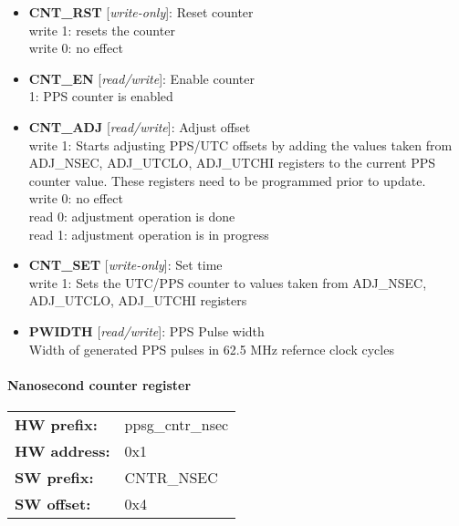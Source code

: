 \begin{itemize}
\item \begin{small}
{\bf 
CNT\_RST
} [\emph{write-only}]: Reset counter
\\
write 1: resets the counter\\                				write 0: no effect
\end{small}
\item \begin{small}
{\bf 
CNT\_EN
} [\emph{read/write}]: Enable counter
\\
1: PPS counter is enabled
\end{small}
\item \begin{small}
{\bf 
CNT\_ADJ
} [\emph{read/write}]: Adjust offset
\\
write 1: Starts adjusting PPS/UTC offsets by adding the values taken from ADJ\_NSEC, ADJ\_UTCLO, ADJ\_UTCHI registers to the current PPS counter value. These registers need to be programmed prior to update.\\				                write 0: no effect\\				 read 0: adjustment operation is done\\				 read 1: adjustment operation is in progress
\end{small}
\item \begin{small}
{\bf 
CNT\_SET
} [\emph{write-only}]: Set time
\\
write 1: Sets the UTC/PPS counter to values taken from ADJ\_NSEC, ADJ\_UTCLO, ADJ\_UTCHI registers
\end{small}
\item \begin{small}
{\bf 
PWIDTH
} [\emph{read/write}]: PPS Pulse width
\\
Width of generated PPS pulses in 62.5 MHz refernce clock cycles
\end{small}
\end{itemize}
\paragraph*{Nanosecond counter register}\vspace{12pt}

\begin{tabular}{l l }
{\bf HW prefix:}  & ppsg\_cntr\_nsec\\
{\bf HW address:}  & 0x1\\
{\bf SW prefix:}  & CNTR\_NSEC\\
{\bf SW offset:}  & 0x4\\
\end{tabular}


